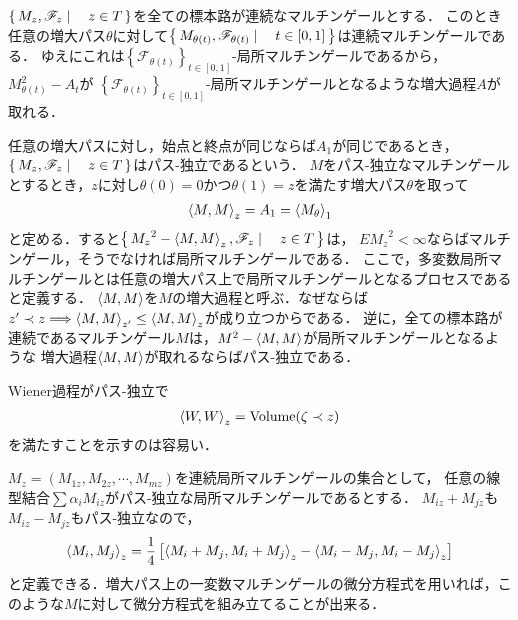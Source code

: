 	$\left\{\, M_{z},\mathscr{F}_{z} \mid \quad z \in T\, \right\}$を全ての標本路が連続なマルチンゲールとする．
	このとき任意の増大パス$\theta$に対して$\left\{\, M_{\theta(t)},\mathscr{F}_{\theta(t)} \mid \quad t \in [0,1]\, \right\}$は連続マルチンゲールである．
	ゆえにこれは$\left\{\mathscr{F}_{\theta(t)}\right\}_{t \in [0,1]}$-局所マルチンゲールであるから，$M_{\theta(t)}^{2} - A_{t}$が
	$\left\{\mathscr{F}_{\theta(t)}\right\}_{t \in [0,1]}$-局所マルチンゲールとなるような増大過程$A$が取れる．
	
	任意の増大パスに対し，始点と終点が同じならば$A_{1}$が同じであるとき，
	$\left\{\, M_{z},\mathscr{F}_{z} \mid \quad z \in T\, \right\}$はパス-独立であるという．
	$M$をパス-独立なマルチンゲールとするとき，$z$に対し$\theta(0) = 0$かつ$\theta(1) = z$を満たす増大パス$\theta$を取って
	\begin{align}
		\inprod<M,M>_{z} = A_{1} = \inprod<M_{\theta}>_{1}
	\end{align}
	と定める．すると$\Set{{M_{z}}^{2} - \inprod<M,M>_{z},\mathscr{F}_{z}}{z \in T}$は，
	$E{M_{z}}^{2} < \infty$ならばマルチンゲール，そうでなければ局所マルチンゲールである．
	ここで，多変数局所マルチンゲールとは任意の増大パス上で局所マルチンゲールとなるプロセスであると定義する．
	$\inprod<M,M>$を$M$の増大過程と呼ぶ．なぜならば
	$z' \prec z \Longrightarrow \inprod<M,M>_{z'} \leq \inprod<M,M>_{z}$が成り立つからである．
	逆に，全ての標本路が連続であるマルチンゲール$M$は，$M^{2} - \inprod<M,M>$が局所マルチンゲールとなるような
	増大過程$\inprod<M,M>$が取れるならばパス-独立である．
	
	Wiener過程がパス-独立で
	\begin{align}
		\inprod<W,W>_{z} = \operatorname{Volume}(\zeta \prec z)
	\end{align}
	を満たすことを示すのは容易い．
	
	$M_{z} = (M_{1z},M_{2z}, \cdots, M_{mz})$を連続局所マルチンゲールの集合として，
	任意の線型結合$\sum \alpha_{i}M_{iz}$がパス-独立な局所マルチンゲールであるとする．
	$M_{iz} + M_{jz}$も$M_{iz} - M_{jz}$もパス-独立なので，
	\begin{align}
		\inprod<M_{i},M_{j}>_{z} = \frac{1}{4}\left[\inprod<M_{i}+M_{j},M_{i}+M_{j}>_{z} - 
		\inprod<M_{i}-M_{j},M_{i}-M_{j}>_{z}\right]
	\end{align}
	と定義できる．増大パス上の一変数マルチンゲールの微分方程式を用いれば，このような$M$に対して微分方程式を組み立てることが出来る．
	
